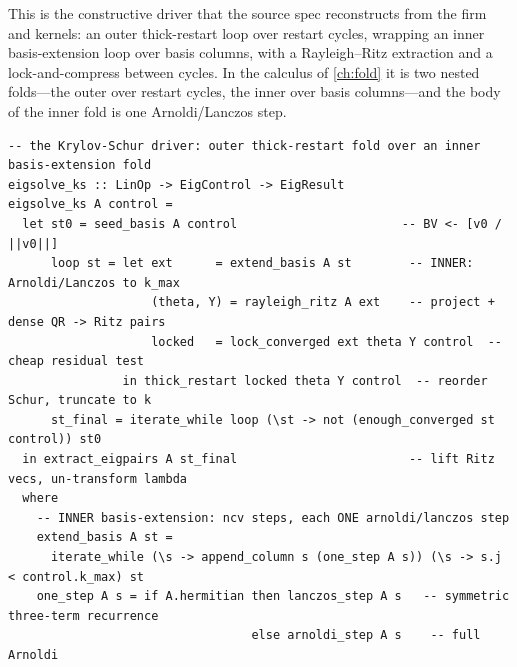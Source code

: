 This is the constructive driver that the source spec reconstructs from the firm
 and  kernels: an outer thick-restart loop over restart
cycles, wrapping an inner basis-extension loop over basis columns, with a Rayleigh--Ritz
extraction and a lock-and-compress between cycles. In the calculus of \cref{ch:fold} it is two
nested  folds---the outer over restart cycles, the inner over basis
columns---and the body of the inner fold is one Arnoldi/Lanczos step.

\begin{lstlisting}[style=l4style]
-- the Krylov-Schur driver: outer thick-restart fold over an inner basis-extension fold
eigsolve_ks :: LinOp -> EigControl -> EigResult
eigsolve_ks A control =
  let st0 = seed_basis A control                       -- BV <- [v0 / ||v0||]
      loop st = let ext      = extend_basis A st        -- INNER: Arnoldi/Lanczos to k_max
                    (theta, Y) = rayleigh_ritz A ext    -- project + dense QR -> Ritz pairs
                    locked   = lock_converged ext theta Y control  -- cheap residual test
                in thick_restart locked theta Y control  -- reorder Schur, truncate to k
      st_final = iterate_while loop (\st -> not (enough_converged st control)) st0
  in extract_eigpairs A st_final                        -- lift Ritz vecs, un-transform lambda
  where
    -- INNER basis-extension: ncv steps, each ONE arnoldi/lanczos step
    extend_basis A st =
      iterate_while (\s -> append_column s (one_step A s)) (\s -> s.j < control.k_max) st
    one_step A s = if A.hermitian then lanczos_step A s   -- symmetric three-term recurrence
                                  else arnoldi_step A s    -- full Arnoldi
\end{lstlisting}

